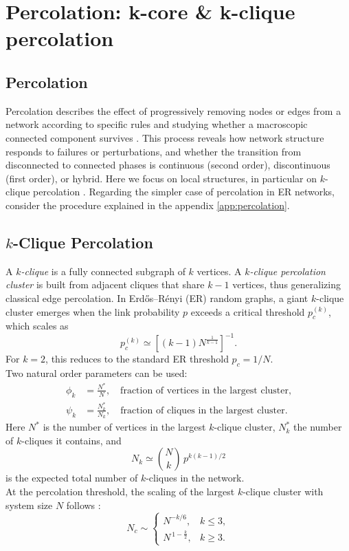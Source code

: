 \chapter{Percolation: k-core \& k-clique percolation}


\section{Percolation}
Percolation describes the effect of progressively removing nodes or edges 
from a network according to specific rules and studying whether a 
macroscopic connected component survives \cite{dedomenico2024dispensa}. 
This process reveals how network structure responds to failures or 
perturbations, and whether the transition from disconnected to connected 
phases is continuous (second order), discontinuous (first order), 
or hybrid. 
Here we focus on local structures, in particular on $k$-clique percolation \cite{derenyi2005clique}.
Regarding the simpler case of percolation in ER networks, consider the procedure explained in the appendix \ref{app:percolation}.

\section{$k$-Clique Percolation}
A \emph{$k$-clique} is a fully connected subgraph of $k$ vertices. 
A \emph{$k$-clique percolation cluster} is built from adjacent cliques 
that share $k-1$ vertices, thus generalizing classical edge percolation. 
In Erdős–Rényi (ER) random graphs, a giant $k$-clique cluster emerges 
when the link probability $p$ exceeds a critical threshold $p_c^{(k)}$, 
which scales as
\begin{equation}
    p_c^{(k)} \simeq \left[(k-1)N^{\tfrac{1}{k-1}}\right]^{-1}.
\end{equation}
For $k=2$, this reduces to the standard ER threshold $p_c = 1/N$.\\
Two natural order parameters can be used:
\begin{align}
    \phi_k &= \frac{N^{*}}{N}, \quad \text{fraction of vertices in the largest cluster,} \\
    \psi_k &= \frac{N_k^{*}}{N_k}, \quad \text{fraction of cliques in the largest cluster.}
\end{align}
Here $N^{*}$ is the number of vertices in the largest $k$-clique cluster, 
$N_k^{*}$ the number of $k$-cliques it contains, and 
\begin{equation}
    N_k \simeq \binom{N}{k} \, p^{k(k-1)/2}
\end{equation}
is the expected total number of $k$-cliques in the network.\\
At the percolation threshold, the scaling of the largest $k$-clique cluster 
with system size $N$ follows \cite{derenyi2005clique}:
\begin{equation}
N_c \sim
\begin{cases}
    N^{-k/6}, & k \leq 3, \\
    N^{\,1 - \tfrac{k}{2}}, & k \geq 3.
\end{cases}
\end{equation}


